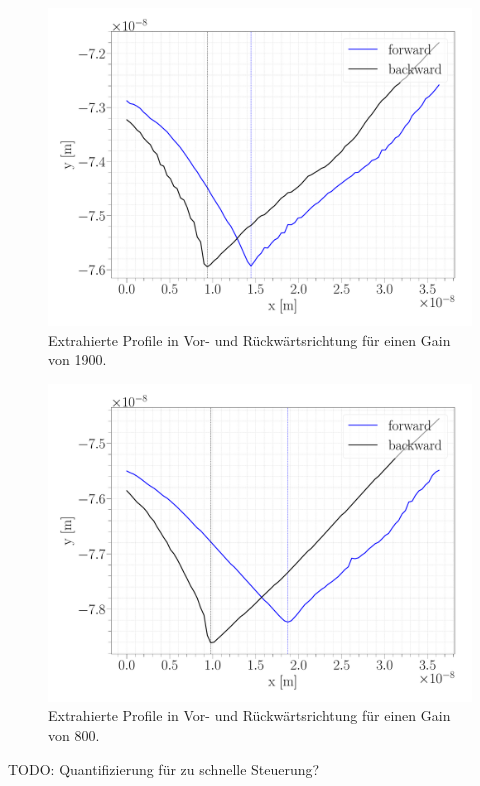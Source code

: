 \begin{figure}[H]
\centering
\includegraphics[width=\textwidth]{../Figures/GAIN_opt_profile.pdf}
\caption{Extrahierte Profile in Vor- und Rückwärtsrichtung für einen Gain von 1900.}
\label{GAIN_opt_profile}
\end{figure}

\begin{figure}[H]
\centering
\includegraphics[width=\textwidth]{../Figures/GAIN_slow_profile.pdf}
\caption{Extrahierte Profile in Vor- und Rückwärtsrichtung für einen Gain von 800.}
\label{GAIN_slow_profile}
\end{figure}


TODO: Quantifizierung für zu schnelle Steuerung?


